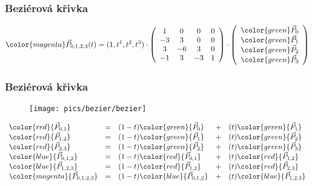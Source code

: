 \begin{frame}
\frametitle{Beziérová křivka}
$$
{\color{magenta}\vec{P}_{0,1,2,3}(t)}=(1,t^1,t^2,t^3)\cdot
\left(
\begin{array}{cccc}
 1 &  0 &  0 &  0 \\
-3 &  3 &  0 &  0 \\
 3 & -6 &  3 &  0 \\
-1 &  3 & -3 &  1
\end{array}
\right)
\cdot
\left(
\begin{array}{c}
  {\color{green}\vec{P}_{0}} \\
  {\color{green}\vec{P}_{1}} \\
  {\color{green}\vec{P}_{2}} \\
  {\color{green}\vec{P}_{3}} 
\end{array}
\right)
$$
\end{frame}


\begin{frame}
\frametitle{Beziérová křivka}
  \begin{figure}[h]
  \texttt{[image: pics/bezier/bezier]}
  \end{figure}
  {\scriptsize
  \[
  \begin{array}{lclcl}
    \color{red}    {\vec{P}_{0,1}    } &=& (1-t)\color{green}{\vec{P}_0      } &+& (t)\color{green}{\vec{P}_1      } \\
    \color{red}    {\vec{P}_{1,2}    } &=& (1-t)\color{green}{\vec{P}_1      } &+& (t)\color{green}{\vec{P}_2      } \\
    \color{red}    {\vec{P}_{2,3}    } &=& (1-t)\color{green}{\vec{P}_2      } &+& (t)\color{green}{\vec{P}_3      } \\
    \color{blue}   {\vec{P}_{0,1,2}  } &=& (1-t)\color{red}  {\vec{P}_{0,1}  } &+& (t)\color{red}  {\vec{P}_{1,2}  } \\
    \color{blue}   {\vec{P}_{1,2,3}  } &=& (1-t)\color{red}  {\vec{P}_{1,2}  } &+& (t)\color{red}  {\vec{P}_{2,3}  } \\
    \color{magenta}{\vec{P}_{0,1,2,3}} &=& (1-t)\color{blue} {\vec{P}_{0,1,2}} &+& (t)\color{blue} {\vec{P}_{1,2,3}} 
  \end{array}
  \]
  }
\end{frame}

